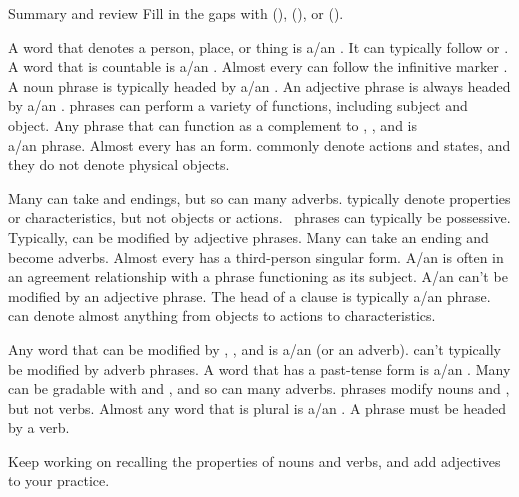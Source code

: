 \begin{tblslineshorizontal}{Summary and review}
    Fill in the gaps with (), (), or ().

    \phantom{a}

    \phantom{zzz}A word that denotes a person, place, or thing is a/an \gap.
    \gap It can typically follow  or . A word that is countable is a/an \gap.
    Almost every \gap can follow the infinitive marker .
    A noun phrase is typically headed by a/an \gap.
    An adjective phrase is always headed by a/an \gap.
    \gap phrases can perform a variety of functions, including subject and object. Any phrase that can function as a complement to , , and  is \\a/an \gap phrase. Almost every \gap has an  form.
    \gap commonly denote actions and states, and they do not denote physical objects.

    \phantom{zzz}Many \gap can take  and  endings, but so can many adverbs.
    \gap typically denote properties or characteristics, but not objects or actions.
    \gap~phrases can typically be possessive. Typically,
    \gap can be modified by adjective phrases. Many \gap can take an  ending and become adverbs. Almost every \gap has a third-person singular  form. A/an \gap is often in an agreement relationship with a phrase functioning as its subject. A/an \gap can't be modified by an adjective phrase. The head of a clause is typically a/an \gap phrase.
    \gap can denote almost anything from objects to actions to characteristics.

    \phantom{zzz}Any word that can be modified by , , and  is a/an \gap (or an adverb).
    \gap can't typically be modified by adverb phrases. A word that has a past-tense form is a/an \gap. Many \gap can be gradable with  and , and so can many adverbs.
    \gap phrases modify nouns and \gap, but not verbs. Almost any word that is plural is a/an \gap.
    A \gap phrase must be headed by a verb.

    \phantom{a}

    \phantom{zzz}Keep working on recalling the properties of nouns and verbs, and add adjectives to your practice.
\end{tblslineshorizontal}

